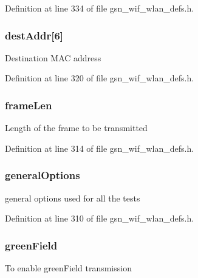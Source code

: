 Definition at line 334 of file gsn\_\-wif\_\-wlan\_\-defs.h.

\hypertarget{a00187_a8b13c9d995b3a022c8481b2e0c972ae0}{
\subsubsection[{destAddr}]{ {\bf destAddr}\mbox{[}6\mbox{]}}}
\label{a00187_a8b13c9d995b3a022c8481b2e0c972ae0}
Destination MAC address 

Definition at line 320 of file gsn\_\-wif\_\-wlan\_\-defs.h.

\hypertarget{a00187_ad7d37183f86bdd7a3c11db21c3301b32}{
\subsubsection[{frameLen}]{ {\bf frameLen}}}
\label{a00187_ad7d37183f86bdd7a3c11db21c3301b32}
Length of the frame to be transmitted 

Definition at line 314 of file gsn\_\-wif\_\-wlan\_\-defs.h.

\hypertarget{a00187_a5e4e9e8d2b76fbb6bdf201c4aeddd60d}{
\subsubsection[{generalOptions}]{ {\bf generalOptions}}}
\label{a00187_a5e4e9e8d2b76fbb6bdf201c4aeddd60d}
general options used for all the tests 

Definition at line 310 of file gsn\_\-wif\_\-wlan\_\-defs.h.

\hypertarget{a00187_a1616fda9db33a672fcd0096af9760f68}{
\subsubsection[{greenField}]{ {\bf greenField}}}
\label{a00187_a1616fda9db33a672fcd0096af9760f68}
To enable greenField transmission 


